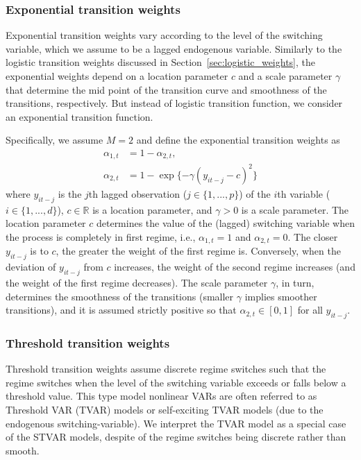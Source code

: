 \documentclass[nojss]{jss}
\begin{document}
\subsubsection{Exponential transition weights}
Exponential transition weights \citep[see, e.g.,][]{Terasvirta:1994} vary according to the level of the switching variable, which we assume to be a lagged endogenous variable. Similarly to the logistic transition weights discussed in Section~\ref{sec:logistic_weights}, the exponential weights depend on a location parameter $c$ and a scale parameter $\gamma$ that determine the mid point of the transition curve and smoothness of the transitions, respectively. But instead of logistic transition function, we consider an exponential transition function.

Specifically, we assume $M=2$ and define the exponential transition weights as
\begin{align}
\alpha_{1,t} &= 1 - \alpha_{2,t},\\
\alpha_{2,t} &= 1 - \exp\lbrace -\gamma(y_{it-j} - c)^2\rbrace
\end{align}
where $y_{it-j}$ is the $j$th lagged observation ($j\in \lbrace 1,...,p \rbrace$) of the $i$th variable ($i\in \lbrace 1,...,d \rbrace$), $c\in\mathbb{R}$ is a location parameter, and $\gamma > 0$ is a scale parameter. The location parameter $c$ determines the value of the (lagged) switching variable when the process is completely in first regime, i.e., $\alpha_{1,t}=1$ and $\alpha_{2,t}=0$. The closer $y_{it-j}$ is to $c$, the greater the weight of the first regime is. Conversely, when the deviation of $y_{it-j}$ from $c$ increases, the weight of the second regime increases (and the weight of the first regime decreases). The scale parameter $\gamma$, in turn, determines the smoothness of the transitions (smaller $\gamma$ implies smoother transitions), and it is assumed strictly positive so that $\alpha_{2,t}\in[0,1]$ for all $y_{it-j}$.

\subsubsection{Threshold transition weights}
Threshold transition weights assume discrete regime switches such that the regime switches when the level of the switching variable exceeds or falls below a threshold value. This type model nonlinear VARs are often referred to as Threshold VAR (TVAR) models \citep{Tsay:1998} or self-exciting TVAR models (due to the endogenous switching-variable). We interpret the TVAR model as a special case of the STVAR models, despite of the regime switches being discrete rather than smooth.
\end{document}
